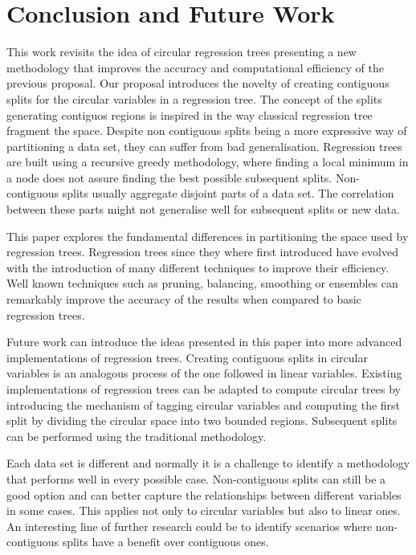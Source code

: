 \documentclass[times,twocolumn,final,authoryear]{elsarticle}
\begin{document}
\section{Conclusion and Future Work}
\label{sec:5}
This work revisits the idea of circular regression trees presenting a new methodology that improves the accuracy and computational efficiency of the previous proposal. Our proposal introduces the novelty of creating contiguous splits for the circular variables in a regression tree. The concept of the splits generating contiguos regions is inspired in the way classical regression tree fragment the space. Despite non contiguous splits being a more expressive way of partitioning a data set, they can suffer from bad generalisation. Regression trees are built using a recursive greedy methodology, where finding a local minimum in a node does not assure finding the best possible subsequent splits. Non-contiguous splits usually aggregate disjoint parts of a data set. The correlation between these parts might not generalise well for subsequent splits or new data.

This paper explores the fundamental differences in partitioning the space used by regression trees. Regression trees since they where first introduced have evolved with the introduction of many different techniques to improve their efficiency. Well known techniques such as pruning, balancing, smoothing \citep{Breimanetal1984, Quinlan1993} or ensembles \citep{Buhlmann2012} can remarkably improve the accuracy of the results when compared to basic regression trees.

Future work can introduce the ideas presented in this paper into more advanced implementations of regression trees. Creating contiguous splits in circular variables is an analogous process of the one followed in linear variables. Existing implementations of regression trees can be adapted to compute circular trees by introducing the mechanism of tagging circular variables and computing the first split by dividing the circular space into two bounded regions. Subsequent splits can be performed using the traditional methodology.

Each data set is different and normally it is a challenge to identify a methodology that performs well in every possible case. Non-contiguous splits can still be a good option and can better capture the relationships between different variables in some cases. This applies not only to circular variables but also to linear ones. An interesting line of further research could be to identify scenarios where non-contiguous splits have a benefit over contiguous ones.
\end{document}
